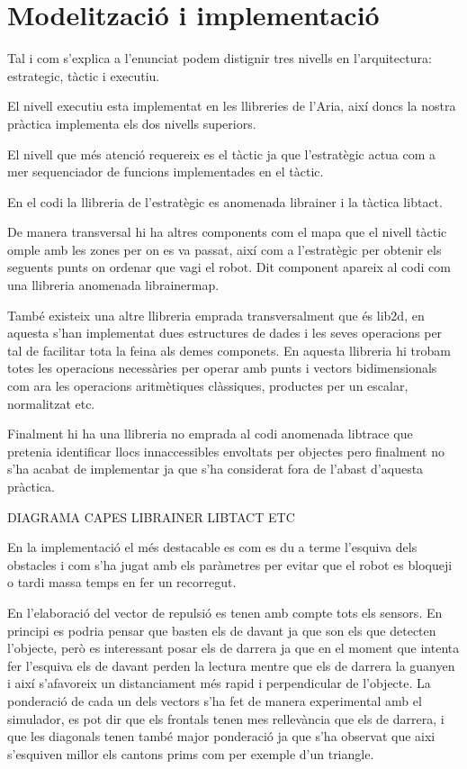 \section{Modelització i implementació}

Tal i com s'explica a l'enunciat podem distignir tres nivells en l'arquitectura: estrategic, tàctic i executiu.

El nivell executiu esta implementat en les llibreries de l'Aria, així doncs la nostra pràctica implementa
els dos nivells superiors.

El nivell que més atenció requereix es el tàctic ja que l'estratègic actua com a mer sequenciador
de funcions implementades en el tàctic.

En el codi la llibreria de l'estratègic es anomenada librainer i la tàctica libtact.

De manera transversal hi ha altres components com el mapa que el nivell tàctic omple amb les zones
per on es va passat, així com a l'estratègic per obtenir els seguents punts on ordenar que vagi el robot.
Dit component apareix al codi com una llibreria anomenada librainermap.

També existeix una altre llibreria emprada transversalment que és lib2d, en aquesta s'han implementat
dues estructures de dades i les seves operacions per tal de facilitar tota la feina als demes componets.
En aquesta llibreria hi trobam totes les operacions necessàries per operar amb punts i vectors bidimensionals
com ara les operacions aritmètiques clàssiques, productes per un escalar, normalitzat etc.

Finalment hi ha una llibreria no emprada al codi anomenada libtrace que pretenia identificar llocs
innaccessibles envoltats per objectes pero finalment no s'ha acabat de implementar ja que s'ha considerat
fora de l'abast d'aquesta pràctica.

DIAGRAMA CAPES LIBRAINER LIBTACT ETC


En la implementació el més destacable es com es du a terme l'esquiva dels obstacles i com s'ha jugat amb
els paràmetres per evitar que el robot es bloqueji o tardi massa temps en fer un recorregut. 

En l'elaboració del vector de repulsió es tenen amb compte tots els sensors. En principi es podria pensar
que basten els de davant ja que son els que detecten l'objecte, però es interessant posar els de darrera
ja que en el moment que intenta fer l'esquiva els de davant perden la lectura mentre que els de darrera
la guanyen i així s'afavoreix un distanciament més rapid i perpendicular de l'objecte. La ponderació
de cada un dels vectors s'ha fet de manera experimental amb el simulador, es pot dir que els frontals
tenen mes rellevància que els de darrera, i que les diagonals tenen també major ponderació ja que 
s'ha observat que aixi s'esquiven millor els cantons prims com per exemple d'un triangle.

